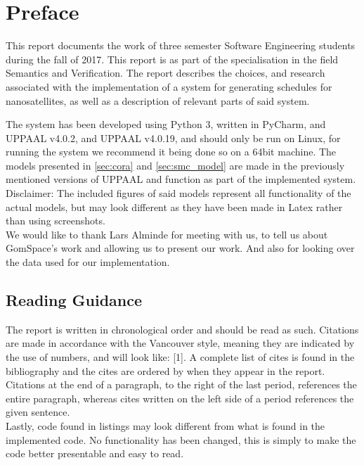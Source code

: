 \chapter*{Preface}
This report documents the work of three  semester Software Engineering students during the fall of 2017.
This report is as part of the specialisation in the field Semantics and Verification. The report describes the choices, and research associated with the implementation of a system for generating schedules for nanosatellites, as well as a description of relevant parts of said system.

The system has been developed using Python 3, written in PyCharm, and UPPAAL v4.0.2, and UPPAAL v4.0.19, and should only be run on Linux, for running the system we recommend it being done so on a 64bit machine. The models presented in \cref{sec:cora}  and \cref{sec:smc_model}  are made in the previously mentioned versions of UPPAAL and function as part of the implemented system. \\
Disclaimer: The included figures of said models represent all functionality of the actual models, but may look different as they have been made in Latex rather than using screenshots.\\

We would like to thank Lars Alminde for meeting with us, to tell us about GomSpace's work and allowing us to present our work. And also for looking over the data used for our implementation.

\section*{Reading Guidance}
The report is written in chronological order and should be read as such. Citations are made in accordance with the Vancouver style, meaning they are indicated by the use of numbers, and will look like: [1]. A complete list of cites is found in the bibliography and the cites are ordered by when they appear in the report. 
Citations at the end of a paragraph, to the right of the last period, references the entire paragraph, whereas cites written on the left side of a period references the given sentence.\\
Lastly, code found in listings may look different from what is found in the implemented code. No functionality has been changed, this is simply to make the code better presentable and easy to read.